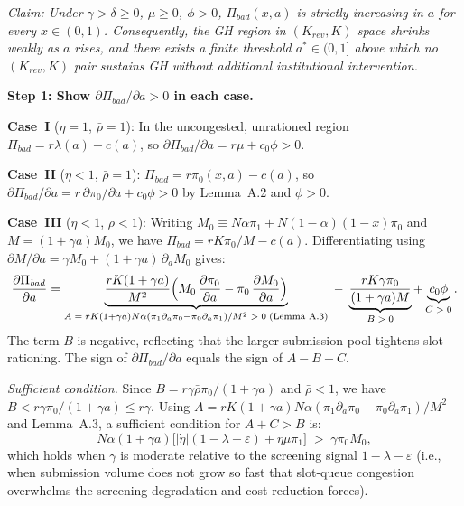 \documentclass{article}
\begin{document}
\noindent\textit{Claim: Under $\gamma > \delta \geq 0$, $\mu \geq 0$, $\phi > 0$, $\Pi_{\mathit{bad}}(x,a)$ is strictly increasing in $a$ for every $x \in (0,1)$.
Consequently, the GH region in $(K_{\mathit{rev}},K)$ space shrinks weakly as $a$ rises, and there exists a finite threshold $a^* \in (0,1]$ above which no $(K_{\mathit{rev}},K)$ pair sustains GH without additional institutional intervention.}

\medskip\noindent\textbf{Step 1: Show $\partial\Pi_{\mathit{bad}}/\partial a > 0$ in each case.}

\noindent\textbf{Case~I} ($\eta=1$, $\bar\rho=1$):
In the uncongested, unrationed region $\Pi_{\mathit{bad}} = r\lambda(a) - c(a)$, so $\partial\Pi_{\mathit{bad}}/\partial a = r\mu + c_0\phi > 0$.

\noindent\textbf{Case~II} ($\eta<1$, $\bar\rho=1$):
$\Pi_{\mathit{bad}} = r\pi_0(x,a) - c(a)$, so $\partial\Pi_{\mathit{bad}}/\partial a = r\,\partial\pi_0/\partial a + c_0\phi > 0$ by Lemma~A.2 and $\phi > 0$.

\noindent\textbf{Case~III} ($\eta<1$, $\bar\rho<1$):
Writing $M_0 \equiv N\alpha\pi_1 + N(1-\alpha)(1-x)\pi_0$ and $M = (1+\gamma a)M_0$,
we have $\Pi_{\mathit{bad}} = rK\pi_0/M - c(a)$.
Differentiating using $\partial M/\partial a = \gamma M_0 + (1+\gamma a)\,\partial_a M_0$ gives:
\[
  \frac{\partial\Pi_{\mathit{bad}}}{\partial a}
  = \underbrace{\frac{rK(1+\gamma a)}{M^2}\Bigl(M_0\,\frac{\partial\pi_0}{\partial a}
    - \pi_0\,\frac{\partial M_0}{\partial a}\Bigr)}_{A\;=\;rK(1+\gamma a)N\alpha(\pi_1\partial_a\pi_0-\pi_0\partial_a\pi_1)/M^2\;>\;0
    \;\text{(Lemma~A.3)}}
  \;-\; \underbrace{\frac{rK\gamma\pi_0}{(1+\gamma a)M}}_{B\;>\;0}
  + \underbrace{c_0\phi}_{C\;>\;0}.
\]
The term $B$ is negative, reflecting that the larger submission pool tightens slot rationing.
The sign of $\partial\Pi_{\mathit{bad}}/\partial a$ equals the sign of $A - B + C$.

\medskip
\noindent\textit{Sufficient condition.}
Since $B = r\gamma\bar\rho\pi_0/(1+\gamma a)$ and $\bar\rho < 1$, we have $B < r\gamma\pi_0/(1+\gamma a) \leq r\gamma$.
Using $A = rK(1+\gamma a)N\alpha(\pi_1\partial_a\pi_0 - \pi_0\partial_a\pi_1)/M^2$ and Lemma~A.3, a sufficient condition for $A + C > B$ is:
\begin{equation}
  \label{eq:caseIII_suff}
  N\alpha(1+\gamma a)\bigl[|\dot\eta|(1-\lambda-\varepsilon)+\eta\mu\pi_1\bigr]
  \;>\; \gamma\pi_0 M_0,
\end{equation}
which holds when $\gamma$ is moderate relative to the screening signal $1-\lambda-\varepsilon$
(i.e., when submission volume does not grow so fast that slot-queue congestion overwhelms the screening-degradation and cost-reduction forces).
\end{document}
